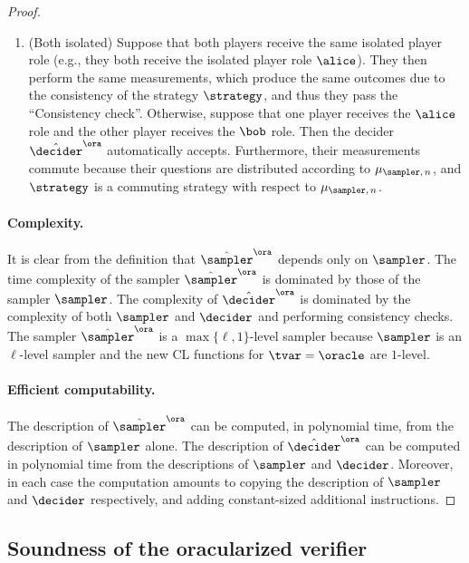 \begin{proof}
\begin{enumerate}
  \item ({Both isolated}) Suppose that both players receive the same isolated
    player role (e.g., they both receive the isolated player role $\alice$).
    They then perform the same measurements, which produce the same outcomes due
    to the consistency of the strategy $\strategy$, and thus they pass the
    ``Consistency check''.
    Otherwise, suppose that one player receives the $\alice$ role and the other
    player receives the $\bob$ role.
    Then the decider $\tdora$ automatically accepts.
    Furthermore, their measurements commute because their questions are
    distributed according to $\mu_{\sampler,\, n}$, and $\strategy$ is a
    commuting strategy with respect to $\mu_{\sampler,\, n}$.
  \end{enumerate}

  \paragraph{Complexity.}
  It is clear from the definition that $\tsora$ depends only on
  $\sampler$.
  The time complexity of the sampler $\tsora$ is dominated by those of
  the sampler $\sampler$.
  The complexity of $\tdora$ is dominated by the complexity of both $\sampler$ and $\decider$
  and performing consistency checks.
  The sampler $\tsora$ is a $\max\{\ell,1\}$-level sampler because
  $\sampler$ is an $\ell$-level sampler and the new CL functions for
  $\tvar=\oracle$ are $1$-level.

  \paragraph{Efficient computability.}
  The description of $\tsora$ can be computed, in polynomial time, from
  the description of $\sampler$ alone.
  The description of $\tdora$ can be computed in polynomial time from the
  descriptions of $\sampler$ and $\decider$.
  Moreover, in each case the computation amounts to copying the description of
  $\sampler$ and $\decider$ respectively, and adding constant-sized additional
  instructions.

\end{proof}

\subsection{Soundness of the oracularized verifier}

